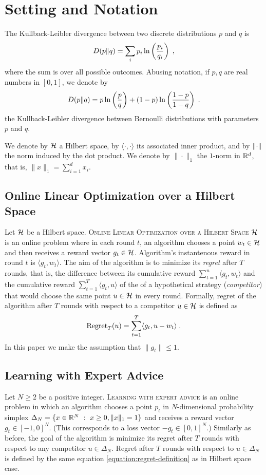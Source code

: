 \section{Setting and Notation}

The Kullback-Leibler divergence between two discrete
distributions $p$ and $q$ is
$$
D({p}\|{q}) = \sum_{i} p_i \ln\left( \frac{p_i}{q_i} \right) \; ,
$$
where the sum is over all possible outcomes. Abusing notation, if $p,q$ are real
numbers in $[0,1]$, we denote by
$$
D({p}\|{q}) = p \ln \left(\frac{p}{q} \right) + (1-p) \ln \left(\frac{1-p}{1-q} \right) \; .
$$
the Kullback-Leibler divergence between Bernoulli distributions with parameters
$p$ and $q$.

We denote by $\mathcal{H}$ a Hilbert space, by $\langle \cdot, \cdot\rangle$ its
associated inner product, and by $\left\|{\cdot}\right\|$ the norm induced by the dot
product. We denote by $\|\cdot\|_1$ the $1$-norm in $\mathbb{R}^d$, that is, $\|x\|_1 =
\sum_{i=1}^d x_i$.


\subsection{Online Linear Optimization over a Hilbert Space}

Let $\mathcal{H}$ be a Hilbert space. \textsc{Online Linear Optimization over a Hilbert
Space $\mathcal{H}$} is an online problem where in each round $t$, an algorithm chooses a
point $w_t \in \mathcal{H}$ and then receives a reward vector $g_t \in \mathcal{H}$. Algorithm's
instantenous reward in round $t$ is $\langle g_t, w_t \rangle$. The aim of the
algorithm is to minimize its \emph{regret} after $T$ rounds, that is, the
difference between its cumulative reward $\sum_{t=1}^n \langle g_t, w_t \rangle$
and the cumulative reward $\sum_{t=1}^T \langle g_t, u \rangle$ of the of a
hypothetical strategy (\emph{competitor}) that would choose the same point $u
\in \mathcal{H}$ in every round. Formally, regret of the algorithm after $T$ rounds with
respect to a competitor $u \in \mathcal{H}$ is defined as
\begin{equation}
\label{equation:regret-definition}
\operatorname{Regret}_T(u) = \sum_{t=1}^T \langle g_t , u - w_t \rangle \; .
\end{equation}
In this paper we make the assumption that $\|g_t\| \le 1$.


\subsection{Learning with Expert Advice}

Let $N \ge 2$ be a positive integer. \textsc{Learning with expert advice} is an
online problem in which an algorithm chooses a point $p_t$ in $N$-dimensional
probability simplex $\Delta_N = \{ x \in \mathbb{R}^N ~:~ x \ge 0, \|x\|_1 = 1 \}$ and
receives a reward vector $g_t \in [-1,0]^N$. (This corresponds to a loss vector
$-g_t \in [0,1]^N$.) Similarly as before, the goal of the algorithm is minimize
its regret after $T$ rounds with respect to any competitor $u \in \Delta_N$.
Regret after $T$ rounds with respect to $u \in \Delta_N$ is defined by the same
equation \eqref{equation:regret-definition} as in Hilbert space case.


